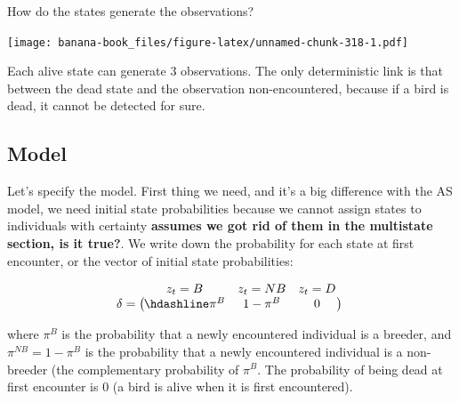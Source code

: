 \documentclass[
  12pt,
]{krantz}
\begin{document}
How do the states generate the observations?

\texttt{[image: banana-book\_files/figure-latex/unnamed-chunk-318-1.pdf]}

Each alive state can generate 3 observations. The only deterministic link is that between the dead state and the observation non-encountered, because if a bird is dead, it cannot be detected for sure.

\hypertarget{model}{%
\subsection{Model}\label{model}}

Let's specify the model. First thing we need, and it's a big difference with the AS model, we need initial state probabilities because we cannot assign states to individuals with certainty \textbf{assumes we got rid of them in the multistate section, is it true?}. We write down the probability for each state at first encounter, or the vector of initial state probabilities:

\[
\begin{matrix}
& \\
\mathbf{\delta} =
    \left ( \vphantom{ \begin{matrix} 12 \end{matrix} } \right .
\end{matrix}
\hspace{-1.2em}
\begin{matrix}
    z_t=B & z_t=NB & z_t=D \\ \hdashline
\pi^B & 1 - \pi^{B} & 0\\
\end{matrix}
\hspace{-0.2em}
\begin{matrix}
& \\
\left . \vphantom{ \begin{matrix} 12 \end{matrix} } \right )
    \begin{matrix}
    \end{matrix}
\end{matrix}
\]

where \(\pi^B\) is the probability that a newly encountered individual is a breeder, and \(\pi^{NB} = 1 - \pi^B\) is the probability that a newly encountered individual is a non-breeder (the complementary probability of \(\pi^B\). The probability of being dead at first encounter is 0 (a bird is alive when it is first encountered).
\end{document}
